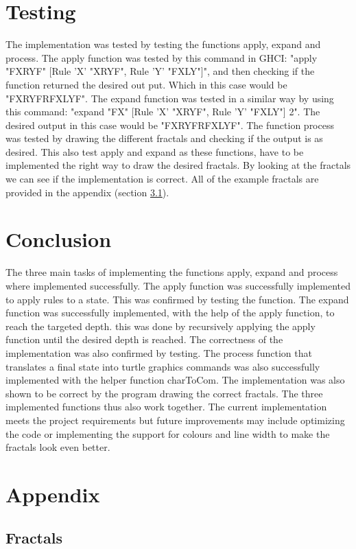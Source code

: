 \documentclass{article}
\begin{document}
\section{Testing}
The implementation was tested by testing the functions apply, expand and process. The apply function was tested by this command in GHCI: "apply "FXRYF" [Rule ’X’ "XRYF", Rule ’Y’ "FXLY"]", and then checking if the function returned the desired out put. Which in this case would be "FXRYFRFXLYF". The expand function was tested in a similar way by using this command: "expand "FX" [Rule ’X’ "XRYF", Rule ’Y’ "FXLY"] 2". The desired output in this case would be "FXRYFRFXLYF". The function process was tested by drawing the different fractals and checking if the output is as desired. This also test apply and expand as these functions, have to be implemented the right way to draw the desired fractals. By looking at the fractals we can see if the implementation is correct. All of the example fractals are provided in the appendix (section \ref{Fractals}).

\section{Conclusion}
The three main tasks of implementing the functions apply, expand and process where implemented successfully. The apply function was successfully implemented to apply rules to a state. This was confirmed by testing the function. The expand function was successfully implemented, with the help of the apply function, to reach the targeted depth. this was done by recursively applying the apply function until the desired depth is reached. The correctness of the implementation was also confirmed by testing. The process function that translates a final state into turtle graphics commands was also successfully implemented with the helper function charToCom. The implementation was also shown to be correct by the program drawing the correct fractals. The three implemented functions thus also work together. The current implementation meets the project requirements but future improvements may include optimizing the code or implementing the support for colours and line width to make the fractals look even better.


\section{Appendix}

\subsection{Fractals} \label{Fractals}
\end{document}
